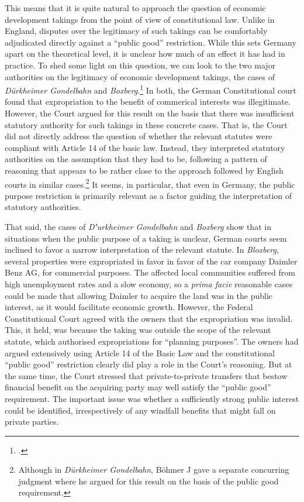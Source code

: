 This means that it is quite natural to approach the question of economic development takings from the point of view of constitutional law. Unlike in England, disputes over the legitimacy of such takings can be comfortably adjudicated directly against a ``public good'' restriction. While this sets Germany apart on the theoretical level, it is unclear how much of an effect it has had in practice. To shed some light on this question, we can look to the two major authorities on the legitimacy of economic development takings, the cases of {\it Dürkheimer Gondelbahn} and {\it Boxberg}.\footcite{boxberg85,} In both, the German Constitutional court found that expropriation to the benefit of commerical interests was illegitimate. However, the Court argued for this result on the basis that there was insufficient statutory authority for such takings in these concrete cases. That is, the Court did not directly address the question of whether the relevant statutes were compliant with Article 14 of the basic law. Instead, they interpreted statutory authorities on the assumption that they had to be, following a pattern of reasoning that appears to be rather close to the approach followed by English courts in similar cases.\footnote{Although in {\it Dürkheimer Gondelbahn}, Böhmer J gave a separate concurring judgment where he argued for this result on the basis of the public good requirement.} It seems, in particular, that even in Germany, the public purpose restriction is primarily relevant as a factor guiding the interpretation of statutory authorities.

That said, the cases of {\it D{\''u}rkheimer Gondelbahn} and {\it Boxberg} show that in situations when the public purpose of a taking is unclear, German courts seem inclined to favor a narrow interpretation of the relevant statute. In {\it Bloxberg}, several properties were expropriated in favor in favor of the car company Daimler Benz AG, for commercial purposes. The affected local communities suffered from high unemployment rates and a slow economy, so a {\it prima facie} reasonable cases could be made that allowing Daimler to acquire the land was in the public interest, as it would facilitate economic growth. However, the Federal Constitutional Court agreed with the owners that the expropriation was invalid. This, it held, was because the taking was outside the scope of the relevant statute, which authorised expropriations for ``planning purposes''. The owners had argued extensively using Article 14 of the Basic Law and the constitutional ``public good'' restriction clearly did play a role in the Court's reasoning. But at the same time, the Court stressed that private-to-private transfers that bestow financial benefit on the acquiring party may well satisfy the ``public good'' requirement. The important issue was whether a sufficiently strong public interest could be identified, irrespectively of any windfall benefits that might fall on private parties.

